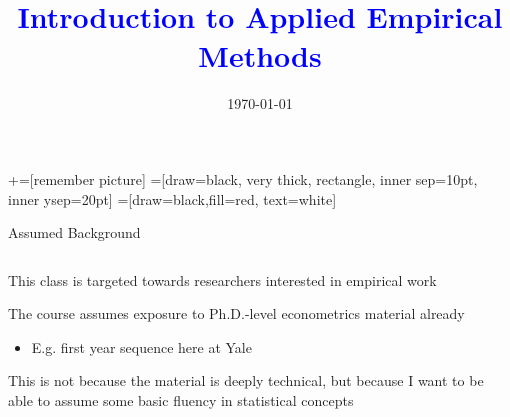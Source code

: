 \documentclass[notes,11pt, aspectratio=169]{beamer}
\title[]{\textcolor{blue}{Introduction to Applied Empirical Methods}}
\author[PGP]{}
\institute[FRBNY]{\small{Paul Goldsmith-Pinkham}}
\date{\today}
\newenvironment{wideitemize}{\itemize\addtolength{\itemsep}{10pt}}{\enditemize}
\begin{document}
\newcommand\marktopleft[1]{%
    \tikz[overlay,remember picture] 
        \node (marker-#1-a) at (-.3em,.3em) {};%
}
\newcommand\markbottomright[2]{%
    \tikz[overlay,remember picture] 
        \node (marker-#1-b) at (0em,0em) {};%
}
+=[remember picture] 
 =[draw=black, very thick, rectangle, inner sep=10pt, inner ysep=20pt]
 =[draw=black,fill=red, text=white]

\begin{frame}
\maketitle

\end{frame}

\begin{frame}{Assumed Background}
\begin{columns}[T] %
\begin{column}{.7\textwidth}
  \begin{wideitemize}
  \item This class is targeted towards researchers interested in empirical work
  \item The course assumes exposure to Ph.D.-level econometrics material already
    \begin{itemize}
    \item E.g. first year sequence here at Yale
    \end{itemize}
  \item This is not because the material is deeply technical, but
    because I want to be able to assume some basic fluency in
    statistical concepts
  \end{wideitemize}
\end{column}%
\hfill%
\begin{column}{.38\textwidth}
  \makebox[\linewidth][c]{
    \resizebox{\linewidth}{!}{
    }
  }
\end{column}%
\end{columns}
\end{frame}
\end{document}
